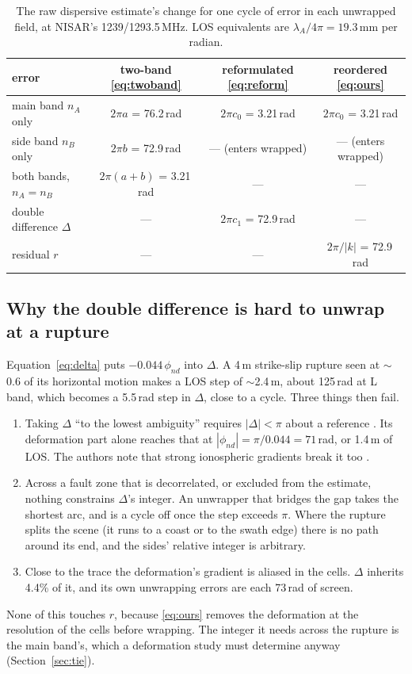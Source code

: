 \begin{table}[t]
\centering
\caption{The raw dispersive estimate's change for one cycle of error in each unwrapped field, at NISAR's
1239/1293.5\,MHz. LOS equivalents are $\lambda_A/4\pi = 19.3$\,mm per radian.}
\label{tab:integers}
\begin{tabular}{lccc}
\toprule
error & two-band \eqref{eq:twoband} & reformulated \eqref{eq:reform} & reordered \eqref{eq:ours} \\
\midrule
main band $n_A$ only            & $2\pi a$ = 76.2\,rad & $2\pi c_0$ = 3.21\,rad & $2\pi c_0$ = 3.21\,rad \\
side band $n_B$ only            & $2\pi b$ = 72.9\,rad & --- (enters wrapped)   & --- (enters wrapped)   \\
both bands, $n_A=n_B$           & $2\pi(a+b)$ = 3.21\,rad & ---                 & ---                    \\
double difference $\Delta$      & ---                  & $2\pi c_1$ = 72.9\,rad & ---                    \\
residual $r$                    & ---                  & ---                    & $2\pi/|k|$ = 72.9\,rad \\
\bottomrule
\end{tabular}
\end{table}

\subsection{Why the double difference is hard to unwrap at a rupture}
Equation~\eqref{eq:delta} puts $-0.044\,\phi_{nd}$ into $\Delta$. A 4\,m strike-slip rupture seen at $\sim$0.6 of
its horizontal motion makes a LOS step of $\sim$2.4\,m, about 125\,rad at L band, which becomes a 5.5\,rad step in
$\Delta$, close to a cycle. Three things then fail.
\begin{enumerate}
  \item Taking $\Delta$ ``to the lowest ambiguity'' requires $|\Delta|<\pi$ about a reference
        \citep{wegmuller2018reformulating}. Its deformation part alone reaches that at
        $|\phi_{nd}| = \pi/0.044 = 71$\,rad, or 1.4\,m of LOS. The authors note that strong ionospheric gradients
        break it too \citep{wegmuller2024palsar3}.
  \item Across a fault zone that is decorrelated, or excluded from the estimate, nothing constrains $\Delta$'s integer.
        An unwrapper that bridges the gap takes the shortest arc, and is a cycle off once the step exceeds $\pi$.
        Where the rupture splits the scene (it runs to a coast or to the swath edge) there is no path around its
        end, and the sides' relative integer is arbitrary.
  \item Close to the trace the deformation's gradient is aliased in the cells. $\Delta$ inherits 4.4\% of it, and
        its own unwrapping errors are each 73\,rad of screen.
\end{enumerate}
None of this touches $r$, because \eqref{eq:ours} removes the deformation at the resolution of the cells before
wrapping. The integer it needs across the rupture is the main band's, which a deformation study must determine
anyway (Section~\ref{sec:tie}).

